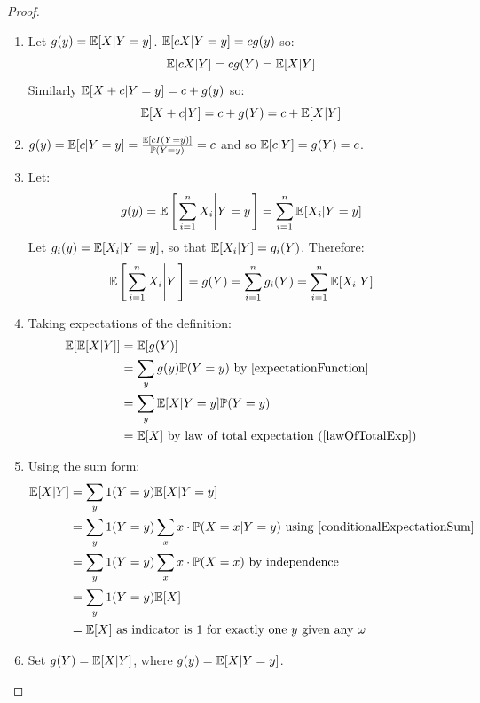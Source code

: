 \documentclass[../main.tex]{subfiles}
\begin{document}
\begin{proof}
  \begin{enumerate}
    \item Let $g(y) = \mathbb{E}[X \vert Y = y]$.
      $\mathbb{E}[cX \vert Y = y] = c g(y)$ so:
      \[
        \mathbb{E}[cX \vert Y] = c g(Y) = \mathbb{E}[X \vert Y]
      \]
      Similarly $\mathbb{E}[X + c \vert Y = y] = c + g(y)$ so:
      \[
        \mathbb{E}[X + c \vert Y] = c + g(Y) = c + \mathbb{E}[X \vert Y]
      \]
    \item $g(y) = \mathbb{E}[c \vert Y = y] = \frac{\mathbb{E}[c I(Y = y)]}{\mathbb{P}(Y = y)} = c$ and so $\mathbb{E}[c \vert Y] = g(Y) = c$.
    \item Let:
      \[
        g(y) = \mathbb{E}\left[\left. \sum_{i = 1}^{n} X_i \middle\vert Y = y \right.\right] = \sum_{i = 1}^{n} \mathbb{E}[X_i \vert Y = y] \\
      \]
      Let $g_i(y) = \mathbb{E}[X_i \vert Y = y]$, so that $\mathbb{E}[X_i \vert Y] = g_i(Y)$.
      Therefore:
      \[
        \mathbb{E}\left[\left. \sum_{i = 1}^{n} X_i \middle\vert Y \right.\right] = g(Y) = \sum_{i = 1}^{n} g_i(Y) = \sum_{i = 1}^{n} \mathbb{E}[X_i \vert Y]
      \]
    \item
      Taking expectations of the definition:
      \begin{align*}
        \E[\E[X \vert Y]] &= \E[g(Y)] \\
                          &= \sum_{y} g(y) \P(Y = y) \text{ by \cref{expectationFunction}} \\
                          &= \sum_{y} \E[X \vert Y = y]\P(Y = y) \\
                          &= \E[X] \text{ by law of total expectation (\cref{lawOfTotalExp})}
      \end{align*}
    \item
      Using the sum form:
      \begin{align*}
        \E[X \vert Y] &= \sum_{y} 1(Y = y)\E[X \vert Y = y] \\
                      &= \sum_{y} 1(Y = y)\sum_{x} x \cdot \P(X = x \vert Y = y) \text{ using \cref{conditionalExpectationSum}} \\
                      &= \sum_{y} 1(Y = y)\sum_{x} x \cdot \P(X = x) \text{ by independence} \\
                      &= \sum_{y} 1(Y = y) \E[X] \\
                      &= \E[X] \text{ as indicator is 1 for exactly one $y$ given any $\omega$}
      \end{align*}
    \item Set $g(Y) = \mathbb{E}[X \vert Y]$, where $g(y) = \mathbb{E}[X \vert Y = y]$.

\end{enumerate}
\end{proof}
\end{document}
